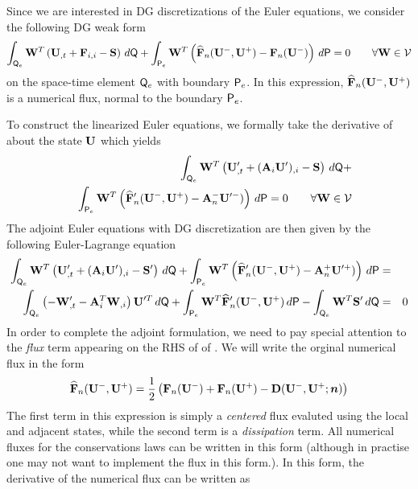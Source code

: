 \documentclass[12pt]{article}
\begin{document}
Since we are interested in DG discretizations of the Euler equations, we
consider the following DG weak form
\begin{equation} \label{e:euler_dg}
\int_{{\sf Q}_e} {\bf W}^T \left({{\bf U}}_{,t} + {\bf F}_{i,i} - {\bf S} \right) \,d{\sf Q} +
\int_{{\sf P}_e} {\bf W}^T \left( {\widehat{{\bf F}}}_n({{\bf U}}^-,{{\bf U}}^+) - {\bf F}_n({{\bf U}}^-) \right) \,d{\sf P} 
= 0 \qquad \forall {\bf W} \in {\mathcal V}
\end{equation}
on the space-time element ${\sf Q}_e$ with boundary ${\sf P}_e$.  In this expression,
${\widehat{{\bf F}}}_n({{\bf U}}^-,{{\bf U}}^+)$ is a numerical flux, normal to the boundary ${\sf P}_e$.

To construct the linearized Euler equations, we formally take the \frechet
derivative of  about the state ${{\bf U}}$ which yields
\begin{eqnarray}
&&\int_{{\sf Q}_e} {\bf W}^T \left({{\bf U}}'_{,t} + ({\bf A}_i{{\bf U}}')_{,i} - {\bf S} \right) \,d{\sf Q} +
\nonumber\\
&&\int_{{\sf P}_e} {\bf W}^T \left( {\widehat{{\bf F}}}'_n({{\bf U}}^-,{{\bf U}}^+) - 
{\bf A}^-_n{{\bf U}}'^-) \right) \,d{\sf P} = 0 \qquad \forall {\bf W} \in {\mathcal V} 
\end{eqnarray}
The adjoint Euler equations with DG discretization are then given by the
following Euler-Lagrange equation
\begin{eqnarray} \label{e:dg_euler_lagrange}
\int_{\sQ_e} \bW^T \left(\bU'_{,t} + (\bA_i\bU')_{,i} - \bS' \right) \,d\sQ +
\int_{\sP_e} \bW^T \left( \hbF'_n(\bU^-,\bU^+) - 
\bA^+_n\bU'^+) \right) \,d\sP &=& \nonumber\\
\int_{\sQ_e} \left(-\bW'_{,t} - \bA^T_i\bW_{,i} \right) \bU'^T \,d\sQ +
\int_{\sP_e} \bW^T \hbF'_n(\bU^-,\bU^+) \,d\sP - \int_{\sQ_e} \bW^T\bS'\,d\sQ 
&=& 0 %
\end{eqnarray}
In order to complete the adjoint formulation, we need to pay special attention
to the {\em flux} term appearing on the RHS of of .
We will write the orginal numerical flux in the form
\begin{equation}
{\widehat{{\bf F}}}_n({{\bf U}}^-,{{\bf U}}^+) = \frac{1}{2}\left( {\bf F}_n({{\bf U}}^-) + {\bf F}_n({{\bf U}}^+) - 
                      {\bf D}({{\bf U}}^-,{{\bf U}}^+;{\boldsymbol n}) \right)
\end{equation}
The first term in this expression is simply a {\em centered} flux evaluted
using the local and adjacent states, while the second term is a {\em
  dissipation} term. All numerical fluxes for the conservations laws can be
written in this form (although in practise one may not want to implement the
flux in this form.).  In this form, the \frechet derivative of the numerical
flux can be written as
\end{document}

